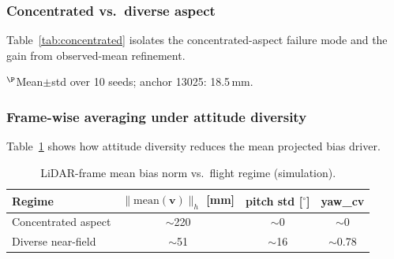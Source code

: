 \subsubsection{Concentrated vs.\ diverse aspect}
Table~\ref{tab:concentrated} isolates the concentrated-aspect failure mode and the
gain from observed-mean refinement.
\begin{table}[!t]
  \centering
  \caption{Concentrated vs.\ diverse aspect (simulation).}
  \label{tab:concentrated}
  \footnotesize
  \vspace{1mm}

  {\footnotesize $^\P$Mean$\pm$std over 10 seeds; anchor 13025: 18.5\,mm.}
\end{table}

\subsubsection{Frame-wise averaging under attitude diversity}
Table~\ref{tab:frame_norm} shows how attitude diversity reduces the mean projected
bias driver.
\begin{table}[t]
  \centering
  \caption{LiDAR-frame mean bias norm vs.\ flight regime (simulation).}
  \label{tab:frame_norm}
  \begin{tabular}{lccc}
    \toprule
    Regime & $\|\mathrm{mean}(\mathbf{v})\|_h$ [mm] & pitch std [$^\circ$] & yaw\_cv \\
    \midrule
    Concentrated aspect & $\sim$220 & $\sim$0 & $\sim$0 \\
    Diverse near-field & $\sim$51 & $\sim$16 & $\sim$0.78 \\
    \bottomrule
  \end{tabular}
\end{table}

